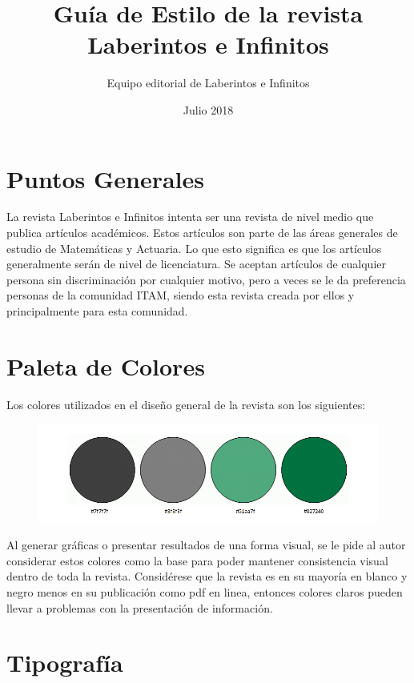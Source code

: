 \documentclass{article}
\title{Guía de Estilo de la revista Laberintos e Infinitos}
\author{Equipo editorial de Laberintos e Infinitos}
\date{Julio 2018}
\begin{document}
\maketitle

\section{Puntos Generales}
La revista Laberintos e Infinitos intenta ser una revista de nivel medio que publica artículos académicos. Estos artículos son parte de las áreas generales de estudio de Matemáticas y Actuaria. Lo que esto significa es que los artículos generalmente serán de nivel de licenciatura. Se aceptan artículos de cualquier persona sin discriminación por cualquier motivo, pero a veces se le da preferencia personas de la comunidad ITAM, siendo esta revista creada por ellos y principalmente para esta comunidad. 

\section{Paleta de Colores}

Los colores utilizados en el diseño general de la revista son los siguientes: 
\begin{figure}[h!]
\includegraphics[width=15cm]{paleta.png}
\centering
\end{figure}

Al generar gráficas o presentar resultados de una forma visual, se le pide al autor considerar estos colores como la base para poder mantener consistencia visual dentro de toda la revista. Considérese que la revista es en su mayoría en blanco y negro menos en su publicación como pdf en linea, entonces colores claros pueden llevar a problemas con la presentación de información. 




\section{Tipografía}
\end{document}
